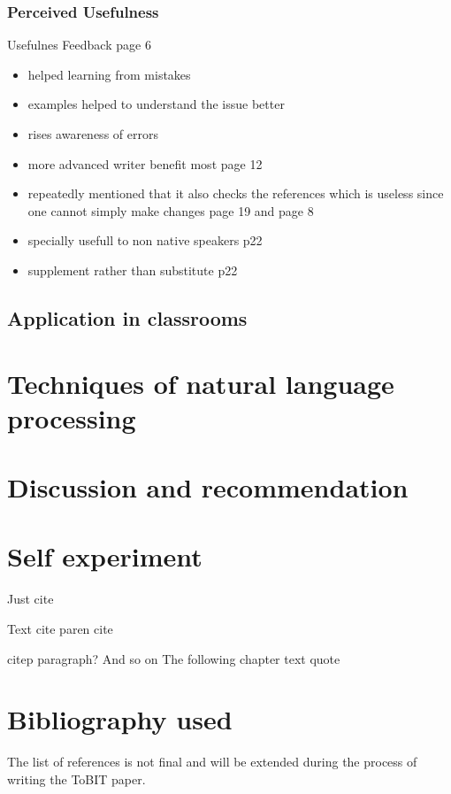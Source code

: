 \documentclass[runningheads]{llncs}
\begin{document}
\subsubsection{Perceived Usefulness} 
Usefulnes Feedback \citep{nova_utilizing_2018} page 6 
\begin{itemize}
    \item helped learning from mistakes
    \item examples helped to understand the issue better
    \item rises awareness of errors
    \item more advanced writer benefit most \citep{cavaleri_you_2016} page 12
    \item repeatedly mentioned that it also checks the references which is useless since one cannot simply make changes \citep{ventayen_graduate_2018} page 19 and \citep{nova_utilizing_2018} page 8
    \item specially usefull to non native speakers \citep{ventayen_graduate_2018} p22
    \item supplement rather than substitute \citep{ventayen_graduate_2018} p22
\end{itemize}

\subsection{Application in classrooms}


\section{Techniques of natural language processing}

\section{Discussion and recommendation}











\section{Self experiment}

Just cite \cite{dembsey_closing_2017}
\newline

Text cite \textcite{dembsey_closing_2017}
\newline
paren cite \parencite{dembsey_closing_2017}
\newline

citep paragraph? And so on \citep{dembsey_closing_2017}
The following chapter 
\newline
text quote 
\newline


\section{Bibliography used}
The list of references is not final and will be extended during the process of writing the ToBIT paper.
\printbibliography
\end{document}
